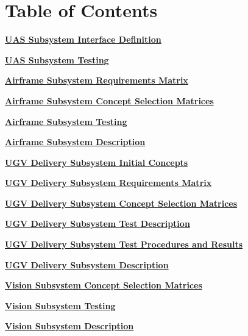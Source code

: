 \documentclass[]{article}
\newcounter{includepdfpage}
\newcommand{\pdflink}[2]{
\hyperlink{#1.1}{\textbf{#2}}
}
\newcommand{\pdflinkdoc}[2]{

}
\begin{document}



\section*{Table of Contents}

\pdflink{ss_def}{UAS Subsystem Interface Definition}

\pdflink{ss_test}{UAS Subsystem Testing}


\pdflink{af_reqmat}{Airframe Subsystem Requirements Matrix}

\pdflink{af_select}{Airframe Subsystem Concept Selection Matrices}

\pdflink{af_test}{Airframe Subsystem Testing}

\pdflink{af_def}{Airframe Subsystem Description}


\pdflink{ugv_init}{UGV Delivery Subsystem Initial Concepts}

\pdflink{ugv_reqmat}{UGV Delivery Subsystem Requirements Matrix}

\pdflink{ugv_select}{UGV Delivery Subsystem Concept Selection Matrices}

\pdflink{ugv_test}{UGV Delivery Subsystem Test Description}

\pdflink{ugv_proc}{UGV Delivery Subsystem Test Procedures and Results}

\pdflink{ugv_def}{UGV Delivery Subsystem Description}


\pdflink{vis_select}{Vision Subsystem Concept Selection Matrices}

\pdflink{vis_test}{Vision Subsystem Testing}

\pdflink{vis_def}{Vision Subsystem Description}


\pdflinkdoc{ss_def}{./SubsystemInterfaces/SubsystemInterfacesDescription/SubsystemInterfaceDefinitions.pdf}
\pdflinkdoc{ss_test}{./SubsystemInterfaces/SITestProceduresAndResults/SITestProceduresAndResults.pdf}

\pdflinkdoc{af_reqmat}{./Airframe/AirframeRequirementsMatrix/AirframeRequirementsMatrix.pdf}
\pdflinkdoc{af_select}{./Airframe/AirframeConceptSelectionMatrices/AirframeConceptSelectionMatrices.pdf}
\pdflinkdoc{af_test}{./Airframe/AirframeConceptTestProceduresAndResults/AirframeConceptTestProceduresAndResults.pdf}
\pdflinkdoc{af_def}{./Airframe/AirframeDescription/AirframeDescription.pdf}

\pdflinkdoc{ugv_init}{./UGV/UGVInitialConcepts/InitialConceptGeneration.pdf}
\pdflinkdoc{ugv_reqmat}{./UGV/UGVRequirmentsMatrix/main.pdf}
\pdflinkdoc{ugv_select}{./UGV/UGVConceptSelectionMatrices/UGVConceptSelectionMatrices.pdf}
\pdflinkdoc{ugv_test}{./UGV/UGVTestDescription/UGV_TestDescription.pdf}
\pdflinkdoc{ugv_proc}{./UGV/UGVConceptTestProceduresAndResults/UGVConceptTestProceduresAndResults.pdf}
\pdflinkdoc{ugv_def}{./UGV/UGVDescription/UGVConceptDescription.pdf}

\pdflinkdoc{vis_select}{./VisionConceptDescription/VisionConceptSelectionMatrices/VisionConceptSelectionMatrices.pdf}
\pdflinkdoc{vis_test}{./VisionConceptDescription/VisionConceptTestProceduresAndResults/VisionTestProceduresAndResults.pdf}
\pdflinkdoc{vis_def}{./VisionConceptDescription/VisionDescription/VisionConceptDescription.pdf}
\end{document}
